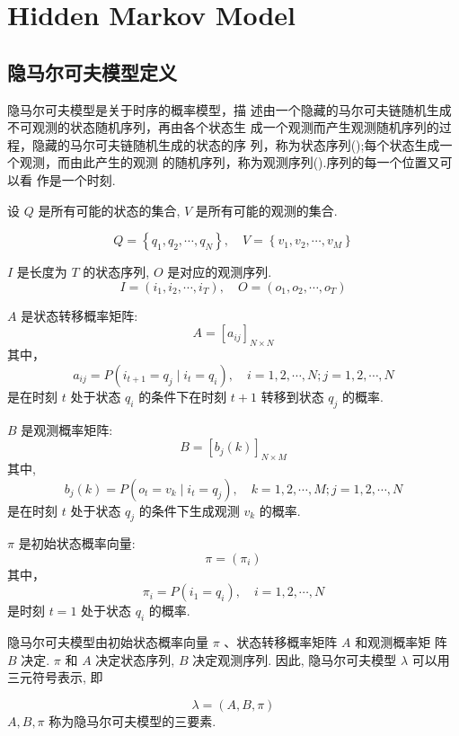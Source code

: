 \chapter{Hidden Markov Model}

\section{隐马尔可夫模型定义}

隐马尔可夫模型是关于时序的概率模型，描
述由一个隐藏的马尔可夫链随机生成不可观测的状态随机序列，再由各个状态生
成一个观测而产生观测随机序列的过程，隐藏的马尔可夫链随机生成的状态的序
列，称为状态序列();每个状态生成一个观测，而由此产生的观测
的随机序列，称为观测序列().序列的每一个位置又可以看
作是一个时刻. 

\begin{definition}[隐马尔可夫模型]
    设 $ Q $ 是所有可能的状态的集合, $ V $ 是所有可能的观测的集合.

$$
Q=\left\{q_{1}, q_{2}, \cdots, q_{N}\right\}, \quad V=\left\{v_{1}, v_{2}, \cdots, v_{M}\right\}
$$

$ I $ 是长度为 $ T $ 的状态序列, $ O $ 是对应的观测序列.
$$
I=\left(i_{1}, i_{2}, \cdots, i_{T}\right), \quad O=\left(o_{1}, o_{2}, \cdots, o_{T}\right)
$$

$ A $ 是状态转移概率矩阵:
$$
A=\left[a_{i j}\right]_{N \times N}
$$
其中，
$$
a_{i j}=P\left(i_{t+1}=q_{j} \mid i_{t}=q_{i}\right), \quad i=1,2, \cdots, N ; j=1,2, \cdots, N
$$
是在时刻 $ t $ 处于状态 $ q_{i} $ 的条件下在时刻 $ t+1 $ 转移到状态 $ q_{j} $ 的概率.

$ B $ 是观测概率矩阵:
$$
B=\left[b_{j}(k)\right]_{N \times M}
$$
其中,
$$
b_{j}(k)=P\left(o_{t}=v_{k} \mid i_{t}=q_{j}\right), \quad k=1,2, \cdots, M ; j=1,2, \cdots, N
$$
是在时刻 $ t $ 处于状态 $ q_{j} $ 的条件下生成观测 $ v_{k} $ 的概率.

$ \pi $ 是初始状态概率向量:
$$
\pi=\left(\pi_{i}\right)
$$
其中，
$$
\pi_{i}=P\left(i_{1}=q_{i}\right), \quad i=1,2, \cdots, N
$$
是时刻 $ t=1 $ 处于状态 $ q_{i} $ 的概率.

\end{definition}

隐马尔可夫模型由初始状态概率向量 $ \pi $ 、状态转移概率矩阵 $ A $ 和观测概率矩 阵 $ B $ 决定. $ \pi $ 和 $ A $ 决定状态序列, $ B $ 决定观测序列. 因此, 隐马尔可夫模型 $ \lambda $ 可以用三元符号表示, 即

$$
\lambda=(A, B, \pi)
$$
$ A, B, \pi $ 称为隐马尔可夫模型的三要素.

